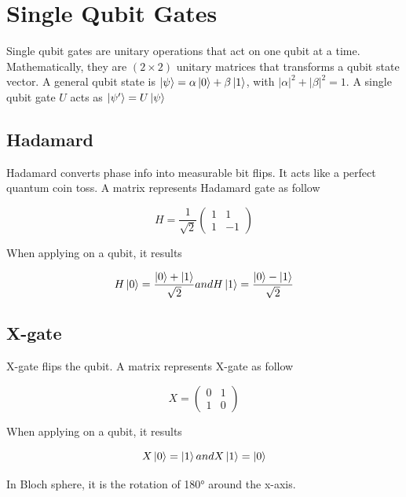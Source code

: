 \documentclass[11pt]{article}
\begin{document}
    \section*{Single Qubit Gates}
    \indent Single qubit gates are unitary operations that act on one qubit at a time.
    Mathematically, they are $(2 \times 2)$ unitary matrices that transforms a qubit state vector.
    \newline\indent
    A general qubit state is $\ket{\psi} = \alpha\ket{0} + \beta\ket{1} $, with $|\alpha|^2 + |\beta|^2 = 1$.
    \newline\indent
    A single qubit gate $U$ acts as $ \ket{\psi'} = U \ket{\psi}$

    \subsection{Hadamard}\label{subsec:hadamard}

    Hadamard converts phase info into measurable bit flips.
    It acts like a perfect quantum coin toss.
    A matrix represents Hadamard gate as follow

    \[
    H = \frac{1}{\sqrt{2}}
    \begin{pmatrix}
        1 & 1 \\
        1 & -1
    \end{pmatrix}
    \]

    When applying on a qubit, it results

    \[
        H\ket{0} = \frac{\ket{0} + \ket{1}}{\sqrt{2}} and
        H\ket{1} = \frac{\ket{0} - \ket{1}}{\sqrt{2}}
    \]

    \subsection{X-gate}\label{subsec:x-gate}

    X-gate flips the qubit.
    A matrix represents X-gate as follow

    \[
        X =
        \begin{pmatrix}
            0 & 1 \\
            1 & 0
        \end{pmatrix}
    \]

    When applying on a qubit, it results

    \[
        X\ket{0} = \ket{1} and
        X\ket{1} = \ket{0}
    \]

    In Bloch sphere, it is the rotation of 180° around the x-axis.
\end{document}
